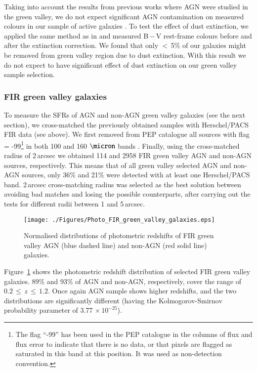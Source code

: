 \documentclass[fleqn,usenatbib]{mnras}
\begin{document}
Taking into account the results from previous works where AGN were studied in the green valley, we do not expect significant AGN contamination on measured colours in our sample of active galaxies \citep[e.g][]{Kauffmann2007, Nandra, Silverman2008, Povi2}. To test the effect of dust extinction, we applied the same method as in \cite{FernandezLorenzo10} and measured B\,$-$\,V rest-frame colours before and after the extinction correction. We found that only $<$\,5\% of our galaxies might be removed from green valley region due to dust extinction. With this result we do not expect to have significant effect of dust extinction on our green valley sample selection. 


\subsubsection{FIR green valley galaxies}

To measure the SFRs of AGN and non-AGN green valley galaxies (see the next section), we cross-matched the previously obtained samples with Herschel/PACS FIR data (see above). We first removed from PEP catalogue all sources with flag = -99\footnote{The flag ``-99'' has been used in the PEP catalogue in the columns of flux and flux error to indicate that there is no data, or that pixels are flagged as saturated in this band at this position. It was used as non-detection convention.} in both 100 and 160 $\rm{\micron}$ bands \citep{Laigle}. Finally, using the cross-matched radius of 2\,arcsec we obtained 114 and 2958 FIR green valley AGN and non-AGN sources, respectively. This means that of all green valley selected AGN and non-AGN sources, only 36\% and 21\% were detected with at least one Herschel/PACS band. 2\,arcsec cross-matching radius was selected as the best solution between avoiding bad matches and losing the possible counterparts, after carrying out the tests for different radii between 1 and 5\,arcsec. 

\begin{figure}
\centering
\texttt{[image: ./Figures/Photo\_FIR\_green\_valley\_galaxies.eps]}
\caption{Normalised distributions of photometric redshifts of FIR green valley AGN (blue dashed line) and non-AGN (red solid line) galaxies.}
\label{fig_GV_Phot_FIR}
\end{figure}

Figure~\ref{fig_GV_Phot_FIR} shows the photometric redshift distribution of selected FIR green valley galaxies. 89\% and 93\% of AGN and non-AGN, respectively, cover the range of $0.2\,\leq\,z\,\leq\,1.2$. Once again AGN sample shows higher redshifts, and the two distributions are significantly different (having the Kolmogorov-Smirnov probability parameter of 3.77 $\times\,10^{-25}$).
\end{document}
